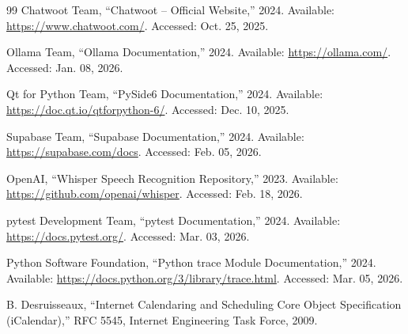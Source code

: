 \begin{thebibliography}{99}
Chatwoot Team, ``Chatwoot -- Official Website,'' 2024. Available: \url{https://www.chatwoot.com/}. Accessed: Oct. 25, 2025.

Ollama Team, ``Ollama Documentation,'' 2024. Available: \url{https://ollama.com/}. Accessed: Jan. 08, 2026.

Qt for Python Team, ``PySide6 Documentation,'' 2024. Available: \url{https://doc.qt.io/qtforpython-6/}. Accessed: Dec. 10, 2025.

Supabase Team, ``Supabase Documentation,'' 2024. Available: \url{https://supabase.com/docs}. Accessed: Feb. 05, 2026.

OpenAI, ``Whisper Speech Recognition Repository,'' 2023. Available: \url{https://github.com/openai/whisper}. Accessed: Feb. 18, 2026.

pytest Development Team, ``pytest Documentation,'' 2024. Available: \url{https://docs.pytest.org/}. Accessed: Mar. 03, 2026.

Python Software Foundation, ``Python trace Module Documentation,'' 2024. Available: \url{https://docs.python.org/3/library/trace.html}. Accessed: Mar. 05, 2026.

B. Desruisseaux, ``Internet Calendaring and Scheduling Core Object Specification (iCalendar),'' RFC 5545, Internet Engineering Task Force, 2009.

\end{thebibliography}
\endgroup
